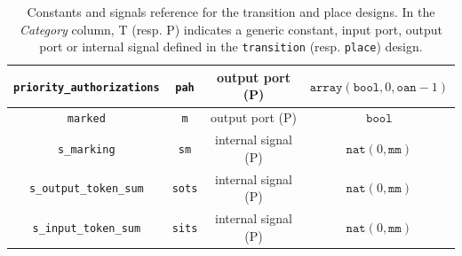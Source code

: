 \documentclass[pdflatex,sn-mathphys]{sn-jnl}%
\theoremstyle{thmstyleone}%
\theoremstyle{thmstyletwo}%
\theoremstyle{thmstylethree}%
\begin{document}
\begin{appendices}
\begin{table}[h]
{\begin{tabular}{|c|c|c|c|}
    \hline
    \texttt{priority\_authorizations} & \texttt{pah} & output port (P) & $\mathtt{array}(\mathtt{bool},0,\mathtt{oan}-1)$ \\
    \hline
    \texttt{marked} & \texttt{m} & output port (P) & $\mathtt{bool}$ \\
    \hline
    \texttt{s\_marking} & \texttt{sm} & internal signal (P) & $\mathtt{nat}(0,\mathtt{mm})$ \\
    \hline
    \texttt{s\_output\_token\_sum} & \texttt{sots} & internal signal (P) & $\mathtt{nat}(0,\mathtt{mm})$ \\
    \hline
    \texttt{s\_input\_token\_sum} & \texttt{sits} & internal signal (P) & $\mathtt{nat}(0,\mathtt{mm})$ \\
    \hline
  \end{tabular}}
  \caption[Constants and signals reference for the \hvhdl{}
  \texttt{transition} and \texttt{place} designs.]{Constants and
    signals reference for the \hvhdl{} transition and place
    designs. In the \textit{Category} column, T (resp. P) indicates a
    generic constant, input port, output port or internal signal
    defined in the \texttt{transition} (resp. \texttt{place})
    design. }
  \label{tab:consts-and-sigs-ref}
\end{table}

  
\end{appendices}



\end{document}
